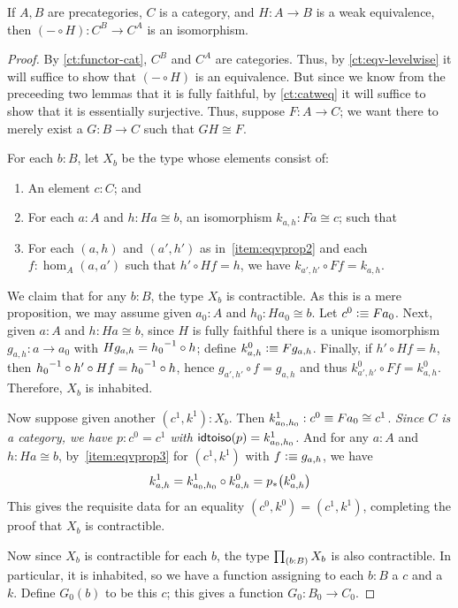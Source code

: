 \begin{thm}\label{ct:cat-weq-eq}
  If $A,B$ are precategories, $C$ is a category, and $H:A\to B$ is a weak equivalence, then $(-\circ H):C^B \to C^A$ is an isomorphism.
\end{thm}
\begin{proof}
  By \autoref{ct:functor-cat}, $C^B$ and $C^A$ are categories.
  Thus, by \autoref{ct:eqv-levelwise} it will suffice to show that $(-\circ H)$ is an equivalence.
  But since we know from the preceeding two lemmas that it is fully faithful, by \autoref{ct:catweq} it will suffice to show that it is essentially surjective.
  Thus, suppose $F:A\to C$; we want there to merely exist a $G:B\to C$ such that $GH\cong F$.

  For each $b:B$, let $X_b$ be the type whose elements consist of:
  \begin{enumerate}
  \item An element $c:C$; and
  \item For each $a:A$ and $h:Ha\cong b$, an isomorphism $k_{a,h}:Fa\cong c$; such that\label{item:eqvprop2}
  \item For each $(a,h)$ and $(a',h')$ as in~\ref{item:eqvprop2} and each $f:\hom_A(a,a')$ such that $h'\circ Hf = h$, we have $k_{a',h'}\circ Ff = k_{a,h}$.\label{item:eqvprop3}
  \end{enumerate}
  We claim that for any $b:B$, the type $X_b$ is contractible.
  As this is a mere proposition, we may assume given $a_0:A$ and $h_0:Ha_0 \cong b$.
  Let $c^0\vcentcolon\equiv Fa_0$.
  Next, given $a:A$ and $h:Ha\cong b$, since $H$ is fully faithful there is a unique isomorphism $g_{a,h}:a\to a_0$ with $Hg_{a,h} = {h_0}^{-1}\circ h$; define $k^0_{a,h} \vcentcolon\equiv Fg_{a,h}$.
  Finally, if $h'\circ Hf = h$, then ${h_0}^{-1}\circ h'\circ Hf = {h_0}^{-1}\circ h$, hence $g_{a',h'} \circ f = g_{a,h}$ and thus $k^0_{a',h'}\circ Ff = k^0_{a,h}$.
  Therefore, $X_b$ is inhabited.

  Now suppose given another $(c^1,k^1): X_b$.
  Then $k^1_{a_0,h_0}:c^0 \equiv Fa_0 \cong c^1$.
  \emph{Since $C$ is a category, we have $p:c^0=c^1$ with $\mathsf{idtoiso}(p) = k^1_{a_0,h_0}$.}
  And for any $a:A$ and $h:Ha\cong b$, by~\ref{item:eqvprop3} for $(c^1,k^1)$ with $f\vcentcolon\equiv g_{a,h}$, we have
  \[k^1_{a,h} = k^1_{a_0,h_0} \circ k^0_{a,h} = {p}_{*}\mathopen{}\left({k^0_{a,h}}\right)\mathclose{}\]
  This gives the requisite data for an equality $(c^0,k^0)=(c^1,k^1)$, completing the proof that $X_b$ is contractible.

  Now since $X_b$ is contractible for each $b$, the type $\prd{b:B} X_b$ is also contractible.
  In particular, it is inhabited, so we have a function assigning to each $b:B$ a $c$ and a $k$.
  Define $G_0(b)$ to be this $c$; this gives a function $G_0 :B_0 \to C_0$.


\end{proof}
